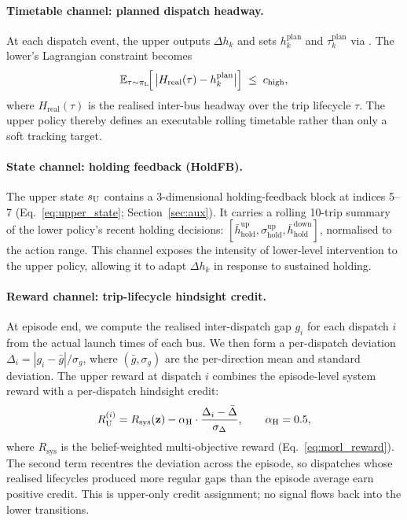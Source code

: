 \paragraph{Timetable channel: planned dispatch headway.}
At each dispatch event, the upper outputs $\Delta h_k$ and sets $h^{\mathrm{plan}}_k$ and $\tau^{\mathrm{plan}}_k$ via . The lower's Lagrangian constraint becomes
\begin{equation}
\label{eq:goal_constraint}
    \mathbb{E}_{\tau \sim \pi_{\mathrm{L}}}\!\!\left[\,\big|H_{\mathrm{real}}(\tau) - h^{\mathrm{plan}}_k\big|\right] \;\leq\; c_{\mathrm{high}},
\end{equation}
where $H_{\mathrm{real}}(\tau)$ is the realised inter-bus headway over the trip lifecycle $\tau$. The upper policy thereby defines an executable rolling timetable rather than only a soft tracking target.

\paragraph{State channel: holding feedback (HoldFB).}
The upper state $s_{\mathrm{U}}$ contains a 3-dimensional holding-feedback block at indices 5--7 (Eq.~\ref{eq:upper_state}; Section~\ref{sec:aux}). It carries a rolling 10-trip summary of the lower policy's recent holding decisions: $[\bar{h}^{\mathrm{up}}_{\mathrm{hold}}, \sigma^{\mathrm{up}}_{\mathrm{hold}}, \bar{h}^{\mathrm{down}}_{\mathrm{hold}}]$, normalised to the action range. This channel exposes the intensity of lower-level intervention to the upper policy, allowing it to adapt $\Delta h_k$ in response to sustained holding.

\paragraph{Reward channel: trip-lifecycle hindsight credit.}
At episode end, we compute the realised inter-dispatch gap $g_i$ for each dispatch $i$ from the actual launch times of each bus. We then form a per-dispatch deviation $\Delta_i = |g_i - \bar{g}|/\sigma_g$, where $(\bar{g}, \sigma_g)$ are the per-direction mean and standard deviation. The upper reward at dispatch $i$ combines the episode-level system reward with a per-dispatch hindsight credit:
\begin{equation}
\label{eq:hindsight_reward}
    R_{\mathrm{U}}^{(i)} = R_{\mathrm{sys}}(\mathbf{z}) - \alpha_{\mathrm{H}} \cdot \frac{\Delta_i - \bar{\Delta}}{\sigma_{\Delta}}, \qquad \alpha_{\mathrm{H}} = 0.5,
\end{equation}
where $R_{\mathrm{sys}}$ is the belief-weighted multi-objective reward (Eq.~\ref{eq:morl_reward}). The second term recentres the deviation across the episode, so dispatches whose realised lifecycles produced more regular gaps than the episode average earn positive credit. This is upper-only credit assignment; no signal flows back into the lower transitions.

